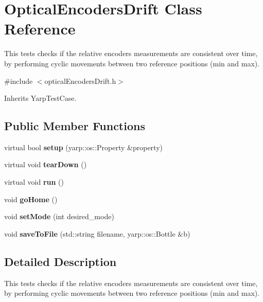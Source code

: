 \section{Optical\-Encoders\-Drift Class Reference}
\label{classOpticalEncodersDrift}


This tests checks if the relative encoders measurements are consistent over time, by performing cyclic movements between two reference positions (min and max).  




{\ttfamily \#include $<$optical\-Encoders\-Drift.\-h$>$}



Inherits Yarp\-Test\-Case.

\subsection*{Public Member Functions}
\begin{DoxyCompactItemize}
\item 
virtual bool {\bfseries setup} (yarp\-::os\-::\-Property \&property)\label{classOpticalEncodersDrift_aaf2fb9fd56a67ad676afb53110a7fadd}

\item 
virtual void {\bfseries tear\-Down} ()\label{classOpticalEncodersDrift_a54fbea332ba8cc678415595243daed45}

\item 
virtual void {\bfseries run} ()\label{classOpticalEncodersDrift_a92d1a9549df738b811ac64d1606fb4d8}

\item 
void {\bfseries go\-Home} ()\label{classOpticalEncodersDrift_a80248a4e68849f768ad0c659e06f92d3}

\item 
void {\bfseries set\-Mode} (int desired\-\_\-mode)\label{classOpticalEncodersDrift_a21d00ce0925d82329311b9f60b651c5b}

\item 
void {\bfseries save\-To\-File} (std\-::string filename, yarp\-::os\-::\-Bottle \&b)\label{classOpticalEncodersDrift_abc12a0ac22ad701e4ebb23168c115c5c}

\end{DoxyCompactItemize}


\subsection{Detailed Description}
This tests checks if the relative encoders measurements are consistent over time, by performing cyclic movements between two reference positions (min and max). 

